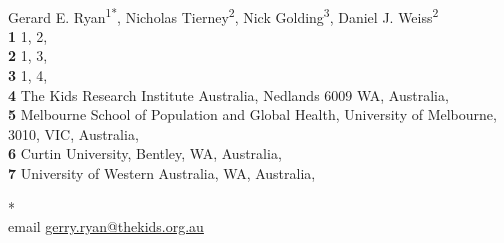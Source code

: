 \documentclass[
  10pt,
  letterpaper,
]{article}
\begin{document}
\vspace*{0.2in}

\begin{flushleft}
{\Large
\textbf{} %
}
\newline
\\
Gerard E. Ryan\textsuperscript{1*}, Nicholas
Tierney\textsuperscript{2}, Nick Golding\textsuperscript{3}, Daniel J.
Weiss\textsuperscript{2}
\\
\bigskip
\textbf{1} 1, 2, \\ \textbf{2} 1, 3, \\ \textbf{3} 1,
4, \\ \textbf{4} The Kids Research Institute Australia, Nedlands 6009
WA, Australia, \\ \textbf{5} Melbourne School of Population and Global
Health, University of Melbourne, 3010, VIC,
Australia, \\ \textbf{6} Curtin University, Bentley, WA,
Australia, \\ \textbf{7} University of Western Australia, WA,
Australia, 
\bigskip

%
%





* \\ email \href{mailto:gerry.ryan@thekids.org.au}{gerry.ryan@thekids.org.au}

\end{flushleft}
\end{document}
